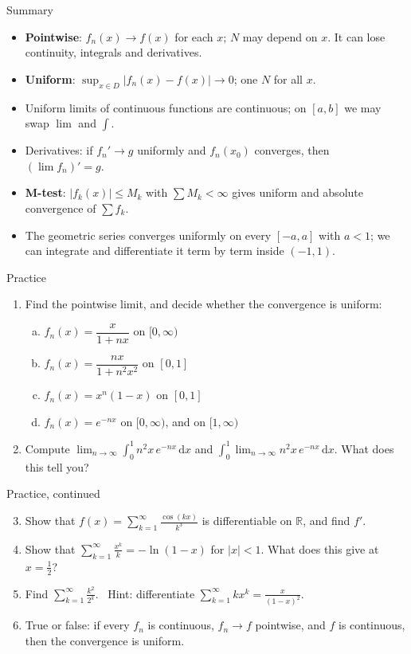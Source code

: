 \documentclass[10pt]{wosm-slides}
\newcommand{\R}{\mathbb{R}}
\newcommand{\dx}{\,\mathrm{d}x}
\begin{document}
\begin{frame}{Summary}
  \begin{itemize}
    \item \textbf{Pointwise}: $f_n(x) \to f(x)$ for each $x$; $N$ may depend on $x$.
      It can lose continuity, integrals and derivatives.
    \item \textbf{Uniform}: $\sup_{x \in D} |f_n(x) - f(x)| \to 0$; one $N$ for all $x$.
    \item Uniform limits of continuous functions are continuous; on $[a, b]$ we may swap
      $\lim$ and $\int$.
    \item Derivatives: if $f_n' \to g$ uniformly and $f_n(x_0)$ converges, then
      $(\lim f_n)' = g$.
    \item \textbf{M-test}: $|f_k(x)| \le M_k$ with $\sum M_k < \infty$ gives uniform and
      absolute convergence of $\sum f_k$.
    \item The geometric series converges uniformly on every $[-a, a]$ with $a < 1$; we can
      integrate and differentiate it term by term inside $(-1, 1)$.
  \end{itemize}
\end{frame}

\begin{frame}{Practice}
  \small
  \begin{enumerate}
    \item Find the pointwise limit, and decide whether the convergence is uniform:
      \begin{enumerate}[(a)]
        \item $f_n(x) = \dfrac{x}{1 + nx}$ on $[0, \infty)$
        \item $f_n(x) = \dfrac{nx}{1 + n^2x^2}$ on $[0, 1]$
        \item $f_n(x) = x^n (1 - x)$ on $[0, 1]$
        \item $f_n(x) = e^{-nx}$ on $[0, \infty)$, and on $[1, \infty)$
      \end{enumerate}
    \item Compute $\lim_{n\to\infty} \int_0^1 n^2 x\, e^{-nx} \dx$ and
      $\int_0^1 \lim_{n\to\infty} n^2 x\, e^{-nx} \dx$. What does this tell you?
  \end{enumerate}
\end{frame}

\begin{frame}{Practice, continued}
  \small
  \begin{enumerate}
    \setcounter{enumi}{2}
    \item Show that $f(x) = \sum_{k=1}^\infty \frac{\cos(kx)}{k^3}$ is differentiable on $\R$,
      and find $f'$.
    \item Show that $\sum_{k=1}^\infty \frac{x^k}{k} = -\ln(1 - x)$ for $|x| < 1$.
      What does this give at $x = \frac12$?
    \item Find $\sum_{k=1}^\infty \frac{k^2}{2^k}$. \ Hint: differentiate
      $\sum_{k=1}^\infty k x^k = \frac{x}{(1-x)^2}$.
    \item True or false: if every $f_n$ is continuous, $f_n \to f$ pointwise, and $f$ is
      continuous, then the convergence is uniform.
  \end{enumerate}
\end{frame}
\end{document}
